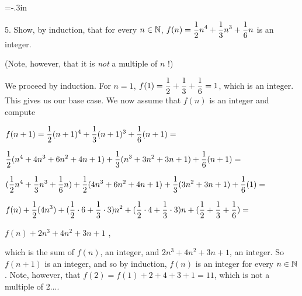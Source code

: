 



\loadmsbm

\ctln{\centerline}
\ssk{\smallskip}
\msk{\medskip}
\bsk{\bigskip}

\overfullrule=0pt
\nopagenumbers

\voffset=-.3in
\vsize=8.2in



\msk


\bsk

\bsk

\item{5.} Show, by induction, that for every $n\in{\Bbb N}$, 
$\displaystyle f(n)={{1}\over{2}}n^4+{{1}\over{3}}n^3+{{1}\over{6}}n$ is an integer.

\ssk

\item{} (Note, however, that it is {\it not} a multiple of $n$ !)

\bsk

\item{} We proceed by induction. For $n=1$, $\displaystyle f(1)={{1}\over{2}}+{{1}\over{3}}+{{1}\over{6}}=1$,
which is an integer. This gives us our base case. We now assume that $f(n)$ is an 
integer and compute 

\ssk

\item{} $\displaystyle f(n+1)={{1}\over{2}}(n+1)^4+{{1}\over{3}}(n+1)^3+{{1}\over{6}}(n+1)=$

\item{} $\displaystyle {{1}\over{2}}(n^4+4n^3+6n^2+4n+1)+{{1}\over{3}}(n^3+3n^2+3n+1)+{{1}\over{6}}(n+1)=$

\item{} $\displaystyle ({{1}\over{2}}n^4+{{1}\over{3}}n^3+{{1}\over{6}}n)+{{1}\over{2}}(4n^3+6n^2+4n+1)+{{1}\over{3}}(3n^2+3n+1)+{{1}\over{6}}(1)=$

\item{} $\displaystyle f(n)+{{1}\over{2}}(4n^3)+({{1}\over{2}}\cdot 6+{{1}\over{3}}\cdot 3)n^2+
({{1}\over{2}}\cdot 4+{{1}\over{3}}\cdot 3)n+({{1}\over{2}}+{{1}\over{3}}+{{1}\over{6}})=$

\item{} $\displaystyle f(n)+2n^3+4n^2+3n+1$ , 

\item{} which is the sum of $f(n)$, an integer, and $2n^3+4n^2+3n+1$, an integer. So $f(n+1)$ is an integer, and so 
by induction, $f(n)$ is an integer for every $n\in{\Bbb N}$. Note, however, that 
$f(2)=f(1)+2+4+3+1=11$, which is not a multiple of 2....

